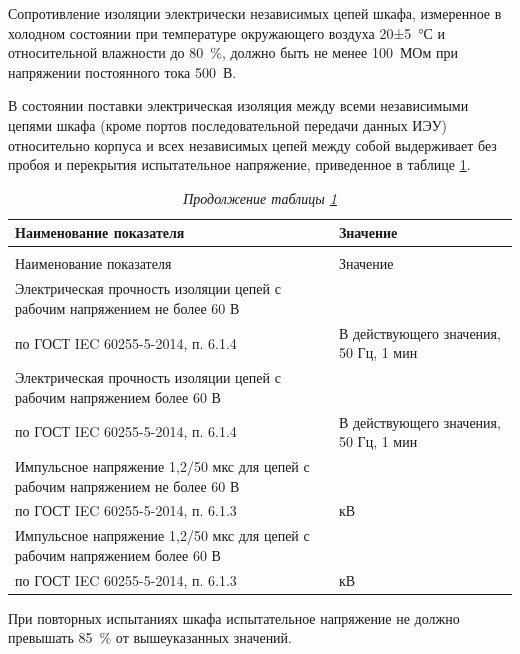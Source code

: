 \begin{enumsubsub}
\item Сопротивление изоляции электрически независимых цепей шкафа, измеренное в холодном состоянии при температуре окружающего воздуха 20±5~°С и относительной влажности до 80~\%, должно быть не менее 100~МОм при напряжении постоянного тока 500~В.
\item В состоянии поставки электрическая изоляция между всеми независимыми цепями шкафа (кроме портов последовательной передачи данных ИЭУ) относительно корпуса и всех независимых цепей между собой выдерживает без пробоя и перекрытия испытательное напряжение, приведенное в таблице \ref{sec1:tbl3}.
  \begingroup
  \small
  \setlength{\extrarowheight}{0.06cm}
  \begin{longtable}{|>{\centering\arraybackslash}m{12.9cm}|>{\centering\arraybackslash}m{4cm}|}
    \caption{Требования к испытанию изоляции\hfill\vspace{-0.5\baselineskip}}\label{sec1:tbl3}\\
    \hline
    \rowcolor{gray!30} Наименование показателя & Значение \\ \hline
    \endfirsthead
    \caption*{\hspace{3pt}\emph{Продолжение таблицы \ref{sec1:tbl3}\hfill\vspace{-0.5\baselineskip}}}\\
    \hline
    \rowcolor{gray!30} Наименование показателя & Значение \\ \hline
    \endhead
    \hline
    \endfoot
    \endlastfoot
    \raggedright Электрическая прочность изоляции цепей с рабочим напряжением не более 60 В \\ по ГОСТ IEC 60255-5-2014, п. 6.1.4 & \centering\arraybackslash 500 В действующего значения, 50 Гц, 1 мин \\ \hline
    \raggedright Электрическая прочность изоляции цепей с рабочим напряжением более 60 В \\ по ГОСТ IEC 60255-5-2014, п. 6.1.4 & \centering\arraybackslash 2000 В действующего значения, 50 Гц, 1 мин \\ \hline
    \raggedright Импульсное напряжение 1,2/50 мкс для цепей с рабочим напряжением не более 60 В \\ по ГОСТ IEC 60255-5-2014, п. 6.1.3 & \centering\arraybackslash 1 кВ \\ \hline
    \raggedright Импульсное напряжение 1,2/50 мкс для цепей с рабочим напряжением более 60 В \\ по ГОСТ IEC 60255-5-2014, п. 6.1.3 & \centering\arraybackslash 5 кВ \\ \hline
  \end{longtable}
  \endgroup
\item При повторных испытаниях шкафа испытательное напряжение не должно превышать 85~\% от вышеуказанных значений.
\end{enumsubsub}

